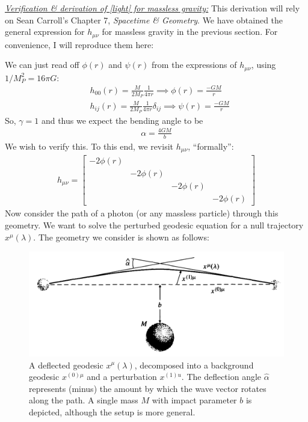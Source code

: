 \documentclass{book}
\theoremstyle{definition}
\newcommand*\widefbox[1]{\fbox{\hspace{2em}#1\hspace{2em}}}
\newcommand{\nn}{\nonumber}
\newcommand{\f}[2]{\frac{#1}{#2}}
\begin{document}
\noindent \underline{\textit{Verification \& derivation of \eqref{light} for massless gravity:}} This derivation will rely on Sean Carroll's Chapter 7, \textit{Spacetime \& Geometry}. We have obtained the general expression for $h_{\mu\nu}$ for massless gravity in the previous section. For convenience, I will reproduce them here:
We can just read off $\phi(r)$ and $\psi(r)$ from the expressions of $h_{\mu\nu}$, using $1/M_P^2 = 16\pi G$:
\begin{align}
&h_{00}(r) = \f{M}{2M_P}\f{1}{4\pi r} \implies \boxed{\phi(r) = \f{-GM}{r}}\nn\\
&h_{ij}(r) = \f{M}{2M_P}\f{1}{4\pi r}\delta_{ij} \implies \boxed{\psi(r) = \f{-GM}{r}}
\end{align}
So, $\gamma = 1$ and thus we expect the bending angle to be 
\begin{align}
\boxed{\alpha = \f{4GM}{b}}
\end{align}
We wish to verify this. To this end, we revisit $h_{\mu\nu}$, ``formally'':
\begin{align}
\boxed{h_{\mu\nu}= \begin{bmatrix}
-2\phi(r) & &&\\
&-2\phi(r)&&\\
&&-2\phi(r)&\\
&&&-2\phi(r)
\end{bmatrix}}
\end{align}
Now consider the path of a photon (or any massless particle) through this geometry. We want to solve the perturbed geodesic equation for a null trajectory $x^\mu(\lambda)$. The geometry we consider is shown as follows:
\begin{figure}[!htb]
	\centering
	\includegraphics[scale=0.3]{bend}
	\caption{A deflected geodesic $x^\mu(\lambda)$, decomposed into a background geodesic $x^{(0)\mu}$ and a perturbation $x^{(1)u}$. The deflection angle $\hat{\alpha}$ represents (minus) the amount by which the wave vector rotates along the path. A single mass $M$ with impact parameter $b$ is depicted, although the setup is more general.}
\end{figure}
\end{document}

